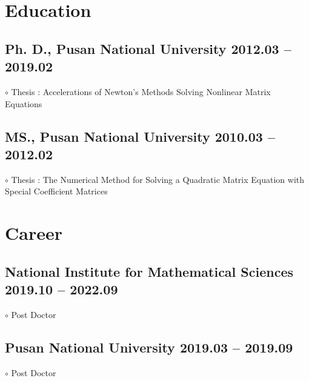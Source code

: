 \documentclass[11pt]{article} %
\begin{document}

\section*{Education}

\subsection*{Ph. D., Pusan National University \hfill 2012.03 -- 2019.02} %
$\circ$ Thesis : Accelerations of Newton's Methods Solving Nonlinear Matrix Equations

\subsection*{MS., Pusan National University \hfill 2010.03 -- 2012.02} %
$\circ$ Thesis : The Numerical Method for Solving a Quadratic Matrix Equation with Special Coefficient Matrices


%


\section*{Career}
\subsection*{National Institute for Mathematical Sciences \hfill 2019.10 -- 2022.09}
$\circ$ Post Doctor
\subsection*{Pusan National University \hfill 2019.03 -- 2019.09}
$\circ$ Post Doctor
\end{document}
